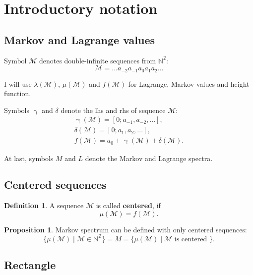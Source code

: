 \documentclass[a4paper, 12pt]{article}
\let\oldref\ref
\renewcommand{\ref}[1]{(\oldref{#1})}
\theoremstyle{definition}
\newtheorem*{definition}{Definition}
\theoremstyle{definition}
\theoremstyle{proposition}
\newtheorem*{proposition}{Proposition}
\theoremstyle{lemma}
\newcommand{\M}{\mathcal{M}}
\renewcommand{\l}{\lambda}
\newcommand{\m}{\mu}
\newcommand{\g}{\upgamma}
\renewcommand{\d}{\delta}
\begin{document}
	
\section{Introductory notation}

\subsection{Markov and Lagrange values}

Symbol $\M$ denotes double-infinite sequences from $\mathbb{N}^\mathbb{Z}$:
\begin{equation*}
	\M = ...a_{-2}a_{-1}a_0a_1a_2...
\end{equation*}

I will use $\l(\M)$, $\m(\M)$ and $f(\M)$ for Lagrange, Markov values and height function.

Symbols $\g$ and $\d$ denote the lhs and rhs of sequence $\M$:
\begin{gather*}
	\g(\M) = [0; a_{-1}, a_{-2}, ...], \\
	\d(\M) = [0; a_1, a_2, ...], \\
	f(\M) = a_0 + \g(\M) + \d(\M).
\end{gather*}

At last, symbols $M$ and $L$ denote the Markov and Lagrange spectra.


\subsection{Centered sequences}

\begin{definition}
	A sequence $\M$ is called \textbf{centered}, if
	\begin{equation}\label{sup_in_0}
		\mu(\M) = f(\M).
	\end{equation}
\end{definition}

\begin{proposition}
	Markov spectrum can be defined with only centered sequences:
	\begin{equation*}
		\{ \m(\M) \mid \M \in \mathbb{N}^\mathbb{Z} \} =
		M =
		\{ \m(\M) \mid \M \text{ is centered } \}.
	\end{equation*}
\end{proposition}



\subsection{Rectangle}
\end{document}
